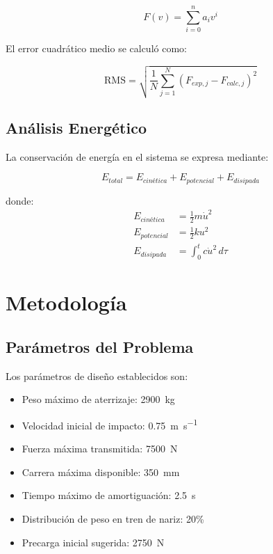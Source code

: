 \documentclass[journal]{IEEEtran}
\begin{document}
\begin{equation}
F(v) = \sum_{i=0}^{n} a_i v^i
\label{eq:force_curve}
\end{equation}

El error cuadrático medio se calculó como:

\begin{equation}
\text{RMS} = \sqrt{\frac{1}{N}\sum_{j=1}^{N}(F_{exp,j} - F_{calc,j})^2}
\label{eq:rms_error}
\end{equation}

\subsection{Análisis Energético}

La conservación de energía en el sistema se expresa mediante:

\begin{equation}
E_{total} = E_{cinética} + E_{potencial} + E_{disipada}
\label{eq:energy_conservation}
\end{equation}

donde:
\begin{align}
E_{cinética} &= \frac{1}{2}m\dot{u}^2 \label{eq:kinetic}\\
E_{potencial} &= \frac{1}{2}ku^2 \label{eq:potential}\\
E_{disipada} &= \int_0^t c\dot{u}^2 \, d\tau \label{eq:dissipated}
\end{align}

\section{Metodología}

\subsection{Parámetros del Problema}

Los parámetros de diseño establecidos son:
\begin{itemize}
\item Peso máximo de aterrizaje: \SI{2900}{\kilo\gram}
\item Velocidad inicial de impacto: \SI{0.75}{\meter\per\second}
\item Fuerza máxima transmitida: \SI{7500}{\newton}
\item Carrera máxima disponible: \SI{350}{\milli\meter}
\item Tiempo máximo de amortiguación: \SI{2.5}{\second}
\item Distribución de peso en tren de nariz: 20\%
\item Precarga inicial sugerida: \SI{2750}{\newton}
\end{itemize}
\end{document}

